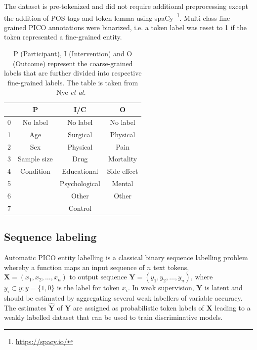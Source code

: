 \documentclass[10.7pt,]{article}
\begin{document}
The dataset is pre-tokenized and did not require additional preprocessing except the addition of POS tags and token lemma using spaCy~\footnote{\url{https://spacy.io/}}.
Multi-class fine-grained PICO annotations were binarized, i.e. a token label was reset to 1 if the token represented a fine-grained entity.
%
\begin{table}[h!]
\begin{center}
\begin{tabular}{| c | c | c | c |} 
\hline
 & P & I/C & O \\ 
\hline
0 & No label & No label & No label \\ 
1 & Age & Surgical & Physical \\ 
2 & Sex & Physical & Pain \\
3 & Sample size & Drug & Mortality \\
4 & Condition & Educational & Side effect \\
5 &  & Psychological & Mental \\
6 &  & Other & Other \\
7 &  & Control &  \\
\hline
\end{tabular}
\caption{\label{tab:coarsefineconcept} P (Participant), I (Intervention) and O (Outcome) represent the coarse-grained labels that are further divided into respective fine-grained labels. The table is taken from Nye \textit{et al.}~\cite{nye2018corpus}}
\end{center}
\end{table}
%
\subsection{Sequence labeling}\label{seq_lab}
%
Automatic PICO entity labelling is a classical binary sequence labelling problem whereby a function maps an input sequence of $n$ text tokens, $ \bm{X} = (x_{1}, x_{2}, \dotso , x_{n} )$ to output sequence $\bm{Y} = (y_{1}, y_{2}, \dotso , y_{n} )$, where $y_{i} \subset y; y = \{1,0\} $ is the label for token $x_{i}$.
In weak supervision, $\bm{Y}$ is latent and should be estimated by aggregating several weak labellers of variable accuracy.
The estimates $\bm{\hat{Y}}$ of $\bm{Y}$ are assigned as probabilistic token labels of $\bm{X}$ leading to a weakly labelled dataset that can be used to train discriminative models.
%
\end{document}
